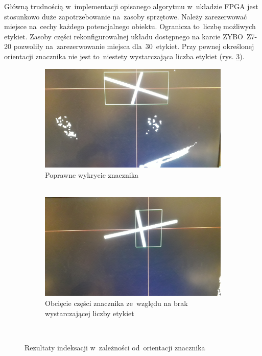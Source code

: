 Główną trudnością w~implementacji opisanego algorytmu w~układzie FPGA jest stosunkowo duże zapotrzebowanie na~zasoby sprzętowe. 
Należy zarezerwować miejsce na~cechy każdego potencjalnego obiektu. 
Ogranicza to~liczbę możliwych etykiet. 
Zasoby części rekonfigurowalnej układu dostępnego na karcie ZYBO~Z7-20 pozwoliły na~zarezerwowanie miejsca dla~30~etykiet. 
Przy pewnej określonej orientacji znacznika nie jest to~niestety wystarczająca liczba etykiet (rys. \ref{fig:rezultaty_ind}). 
\begin{figure}
	\centering
	\begin{subfigure}{0.45\textwidth}
		\centering
		\includegraphics[width=\textwidth]{ind_poprawna.jpg}
		\caption{Poprawne wykrycie znacznika\\{~~~~~}}  %
		\label{fig:ind_poprawna}
	\end{subfigure}
	\begin{subfigure}{0.45\textwidth}
		\centering
		\includegraphics[width=\textwidth]{ind_niepoprawna.jpg}
		\caption{Obcięcie części znacznika ze~względu na brak wystarczającej liczby etykiet}
		\label{fig:ind_niepoprawna}
	\end{subfigure}\\
	\caption{Rezultaty indeksacji w~zależności od~orientacji znacznika}
	\label{fig:rezultaty_ind}
\end{figure}

